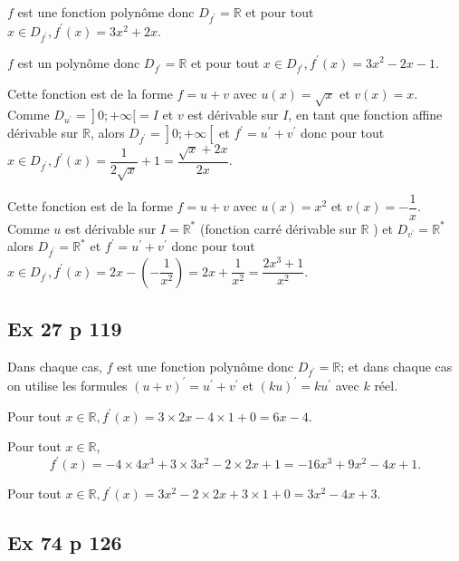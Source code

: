\documentclass[12pt,a4paper]{book}
\begin{document}
\begin{enumMet}
    \item $f$ est une fonction polynôme donc $D_{f^{\prime}}=\mathbb{R}$ et pour tout $x \in D_{f^{\prime}}, f^{\prime}(x)=3 x^{2}+2 x$.
    \item  $f$ est un polynôme donc $D_{f^{\prime}}=\mathbb{R}$ et pour tout $x \in D_{f^{\prime}}, f^{\prime}(x)=3 x^{2}-2 x-1$.
    \item Cette fonction est de la forme $f=u+v$ avec $u(x)=\sqrt{x}$ et $v(x)=x$. Comme $\left.D_{u^{\prime}}=\right] 0 ;+\infty[=I$ et $v$ est dérivable sur $I$, en tant que fonction affine dérivable sur $\mathbb{R}$, alors $\left.D_{f^{\prime}}=\right] 0 ;+\infty\left[\right.$ et $f^{\prime}=u^{\prime}+v^{\prime}$ donc pour tout $x \in D_{f^{\prime}}, f^{\prime}(x)=\dfrac{1}{2 \sqrt{x}}+1=\dfrac{\sqrt{x}+2 x}{2 x} .$
    \item  Cette fonction est de la forme $f=u+v$ avec $u(x)=x^{2}$ et $v(x)=-\dfrac{1}{x}$. Comme $u$ est dérivable sur $I=\mathbb{R}^{*}$ (fonction carré dérivable sur $\mathbb{R}$ ) et $D_{v^{\prime}}=\mathbb{R}^{*}$ alors $D_{f^{\prime}}=\mathbb{R}^{*}$ et $f^{\prime}=u^{\prime}+v^{\prime}$ donc pour tout $x \in D_{f^{\prime}}, f^{\prime}(x)=2 x-\left(-\dfrac{1}{x^{2}}\right)=2 x+\dfrac{1}{x^{2}}=\dfrac{2 x^{3}+1}{x^{2}} .$
\end{enumMet}

\subsection*{Ex 27 p 119}
Dans chaque cas, $f$ est une fonction polynôme donc $D_{f^{\prime}}=\mathbb{R}$; et dans chaque cas on utilise les formules $(u+v)^{\prime}=u^{\prime}+v^{\prime}$ et $(k u)^{\prime}=k u^{\prime}$ avec $k$ réel.
\begin{enumMet}
    \item Pour tout $x \in \mathbb{R}, f^{\prime}(x)=3 \times 2 x-4 \times 1+0=6 x-4$.
    \item Pour tout $x \in \mathbb{R}$,
    $$
    f^{\prime}(x)=-4 \times 4 x^{3}+3 \times 3 x^{2}-2 \times 2 x+1=-16 x^{3}+9 x^{2}-4 x+1 .
    $$
    \item Pour tout $x \in \mathbb{R}, f^{\prime}(x)=3 x^{2}-2 \times 2 x+3 \times 1+0=3 x^{2}-4 x+3$.
\end{enumMet}

\subsection*{Ex 74 p 126}
\end{document}
